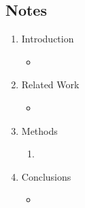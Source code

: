 \documentclass{article}
\begin{document}
\subsection*{Notes}

\begin{enumerate}
	\item Introduction
	\begin{itemize}
		\item 
	\end{itemize}
	\item Related Work
	\begin{itemize}
		\item 
	\end{itemize}
	\item Methods
	\begin{enumerate}
		\item 
	\end{enumerate}
	\item Conclusions
	\begin{itemize}
		\item 
	\end{itemize}
\end{enumerate}

\pagebreak




\end{document}
